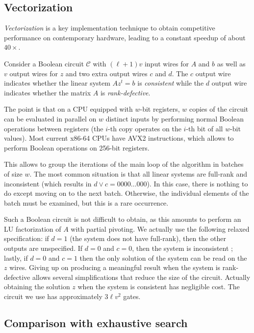 \documentclass[a4paper,UKenglish,cleveref, autoref]{lipics-v2019}
\begin{document}
	\subsection{Vectorization}
	
	\emph{Vectorization} is a key implementation technique to obtain competitive
	performance on contemporary hardware, leading to a constant speedup of about
	$40 \times$.
	
	Consider a Boolean circuit $\mathcal{C}$ with $(\ell+1)v$ input wires for $A$
	and $b$ as well as $v$ output wires for $z$ and two extra output wires $c$ and
	$d$. The $c$ output wire indicates whether the linear system $A z^t = b$ is
	\emph{consistent} while the $d$ output wire indicates whether the matrix $A$ is
	\emph{rank-defective}.
	
	The point is that on a CPU equipped with $w$-bit registers, $w$ copies of the
	circuit can be evaluated in parallel on $w$ distinct inputs by performing normal
	Boolean operations between registers (the $i$-th copy operates on the $i$-th bit
	of all $w$-bit values). Most current \textsf{x86-64} CPUs have \textsf{AVX2}
	instructions, which allows to perform Boolean operations on 256-bit registers.
	
	This allows to group the iterations of the main loop of the algorithm in batches
	of size $w$. The most common situation is that all linear systems are full-rank
	and inconsistent (which results in $d \vee c = 0000 \dots 000$). In this case,
	there is nothing to do except moving on to the next batch. Otherwise, the
	individual elements of the batch must be examined, but this is a rare occurrence.
	
	Such a Boolean circuit is not difficult to obtain, as this amounts to perform an
	LU factorization of $A$ with partial pivoting.  We actually use the following
	relaxed specification: if $d=1$ (the system does not have full-rank), then the
	other outputs are unspecified. If $d=0$ and $c=0$, then the system is
	inconsistent ; lastly, if $d=0$ and $c=1$ then the only solution of the system
	can be read on the $z$ wires. Giving up on producing a meaningful result when
	the system is rank-defective allows several simplifications that reduce the size
	of the circuit. Actually obtaining the solution $z$ when the system is
	consistent has negligible cost. The circuit we use has approximately $3\ell v^2$
	gates.
	
	\subsection{Comparison with exhaustive search}
	
\end{document}
